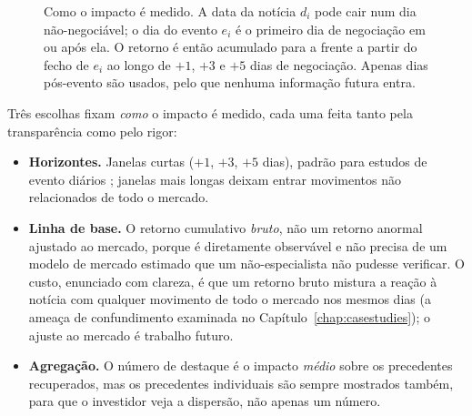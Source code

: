 \begin{figure}[ht]
\centering
{}
\caption[Janelas de impacto de estudo de evento]{Como o impacto é medido. A data da notícia $d_i$ pode cair
num dia não-negociável; o dia do evento $e_i$ é o primeiro dia de negociação em ou após ela. O retorno é
então acumulado para a frente a partir do fecho de $e_i$ ao longo de $+1$, $+3$ e $+5$ dias de negociação.
Apenas dias pós-evento são usados, pelo que nenhuma informação futura entra.}
\label{fig:eventwindow}
\end{figure}

Três escolhas fixam \emph{como} o impacto é medido, cada uma feita tanto pela transparência como pelo rigor:
\begin{itemize}
  \item \textbf{Horizontes.} Janelas curtas ($+1$, $+3$, $+5$ dias), padrão para estudos de evento diários
        \autocite{brown1985daily}; janelas mais longas deixam entrar movimentos não relacionados de todo o
        mercado.
  \item \textbf{Linha de base.} O retorno cumulativo \emph{bruto}, não um retorno anormal ajustado ao
        mercado, porque é diretamente observável e não precisa de um modelo de mercado estimado que um
        não-especialista não pudesse verificar. O custo, enunciado com clareza, é que um retorno bruto
        mistura a reação à notícia com qualquer movimento de todo o mercado nos mesmos dias (a ameaça de
        confundimento examinada no Capítulo~\ref{chap:casestudies}); o ajuste ao mercado é trabalho futuro.
  \item \textbf{Agregação.} O número de destaque é o impacto \emph{médio} sobre os precedentes recuperados,
        mas os precedentes individuais são sempre mostrados também, para que o investidor veja a dispersão,
        não apenas um número.
\end{itemize}

